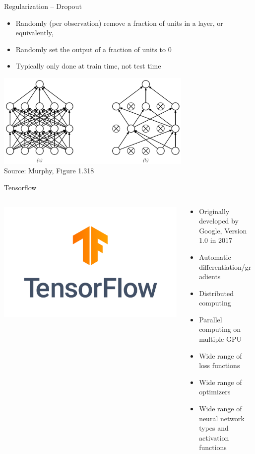 \documentclass[ignorenonframetext,xcolor=x11names]{beamer}
\begin{document}
\begin{frame}{Regularization -- Dropout}
\begin{itemize}
   \item Randomly (per observation) remove a fraction of units in a layer, or equivalently,
   \item Randomly set the output of a fraction of units to 0
   \item Typically only done at train time, not test time
\end{itemize}
\centering
\includegraphics[height=1.8in]{screen7.png} \\

\scriptsize Source: Murphy, Figure 1.318
\end{frame}

\begin{frame}{Tensorflow}
\begin{columns}
\begin{column}{0.3\textwidth}
\includegraphics[width=\textwidth]{tflogo.png}
\end{column}
\begin{column}{0.7\textwidth}
\begin{itemize}
  \item Originally developed by Google, Version 1.0 in 2017
  \item Automatic differentiation/gradients
  \item Distributed computing
  \item Parallel computing on multiple GPU
  \item Wide range of loss functions
  \item Wide range of optimizers
  \item Wide range of neural network types and activation functions
\end{itemize}
\end{column}
\end{columns}
\end{frame}
\end{document}
